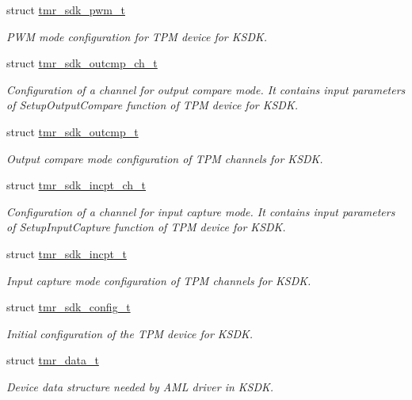 \begin{DoxyCompactItemize}
struct \mbox{\hyperlink{structtmr__sdk__pwm__t}{tmr\+\_\+sdk\+\_\+pwm\+\_\+t}}
\begin{DoxyCompactList}\small\item\em P\+WM mode configuration for T\+PM device for K\+S\+DK. \end{DoxyCompactList}\item 
struct \mbox{\hyperlink{structtmr__sdk__outcmp__ch__t}{tmr\+\_\+sdk\+\_\+outcmp\+\_\+ch\+\_\+t}}
\begin{DoxyCompactList}\small\item\em Configuration of a channel for output compare mode. It contains input parameters of Setup\+Output\+Compare function of T\+PM device for K\+S\+DK. \end{DoxyCompactList}\item 
struct \mbox{\hyperlink{structtmr__sdk__outcmp__t}{tmr\+\_\+sdk\+\_\+outcmp\+\_\+t}}
\begin{DoxyCompactList}\small\item\em Output compare mode configuration of T\+PM channels for K\+S\+DK. \end{DoxyCompactList}\item 
struct \mbox{\hyperlink{structtmr__sdk__incpt__ch__t}{tmr\+\_\+sdk\+\_\+incpt\+\_\+ch\+\_\+t}}
\begin{DoxyCompactList}\small\item\em Configuration of a channel for input capture mode. It contains input parameters of Setup\+Input\+Capture function of T\+PM device for K\+S\+DK. \end{DoxyCompactList}\item 
struct \mbox{\hyperlink{structtmr__sdk__incpt__t}{tmr\+\_\+sdk\+\_\+incpt\+\_\+t}}
\begin{DoxyCompactList}\small\item\em Input capture mode configuration of T\+PM channels for K\+S\+DK. \end{DoxyCompactList}\item 
struct \mbox{\hyperlink{structtmr__sdk__config__t}{tmr\+\_\+sdk\+\_\+config\+\_\+t}}
\begin{DoxyCompactList}\small\item\em Initial configuration of the T\+PM device for K\+S\+DK. \end{DoxyCompactList}\item 
struct \mbox{\hyperlink{structtmr__data__t}{tmr\+\_\+data\+\_\+t}}
\begin{DoxyCompactList}\small\item\em Device data structure needed by A\+ML driver in K\+S\+DK. \end{DoxyCompactList}\end{DoxyCompactItemize}
